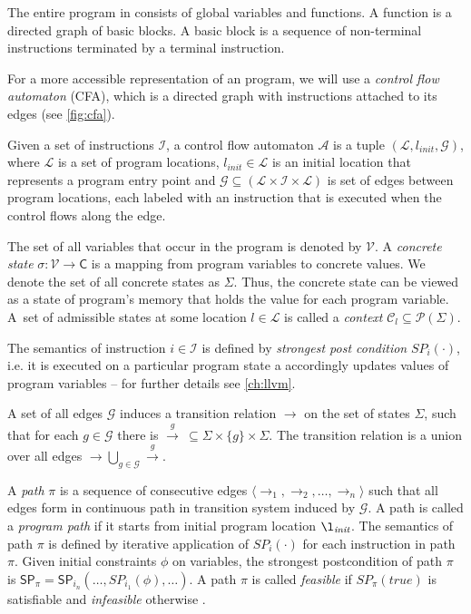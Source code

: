 The entire program in \llvm consists of global variables and functions.  A
function is a directed graph of basic blocks. A basic block is a sequence of
non-terminal instructions terminated by a terminal instruction.

For a more accessible representation of an \llvm program, we will use a
\emph{control flow automaton} (CFA), which is a directed graph with \llvm
instructions attached to its edges (see \autoref{fig:cfa}).

\begin{definition}
    Given a set of instructions $\mathcal{I}$, a control flow automaton
    $\mathcal{A}$ is a tuple $(\mathcal{L}, l_{\textit{init}}, \mathcal{G})$,
    where $\mathcal{L}$ is a set of program locations, $l_{\textit{init}} \in
    \mathcal{L}$ is an initial location that represents a program entry point
    and $\mathcal{G} \subseteq (\mathcal{L} \times \mathcal{I} \times
    \mathcal{L})$ is set of edges between program locations, each labeled with
    an instruction that is executed when the control flows along the edge.
\end{definition}

The set of all variables that occur in the \llvm program is denoted by
$\mathcal{V}$. A \emph{concrete state} $\sigma : \mathcal{V} \rightarrow
\mathsf{C}$ is a mapping from program variables to concrete values. We denote
the set of all concrete states as $\Sigma$. Thus, the concrete state can be
viewed as a state of program's memory that holds the value for each program
variable. A~set of admissible states at some location $l \in \mathcal{L}$ is
called a \emph{context} $\mathcal{C}_l \subseteq \mathcal{P}(\Sigma)$.

The semantics of instruction $i \in \mathcal{I}$ is defined by \emph{strongest
post condition} $SP_{i}(\cdot)$, i.e. it is executed on a particular program
state a accordingly updates values of program variables -- for further details
see \autoref{ch:llvm}.

A set of all edges $\mathcal{G}$ induces a transition relation $\rightarrow$ on
the set of states $\Sigma$, such that for each $g \in \mathcal{G}$ there is
$\xrightarrow{g} \: \subseteq \Sigma \times \{g\} \times \Sigma$. The
transition relation is a union over all edges $\rightarrow \bigcup_{g
\in\mathcal{G}} \xrightarrow{g}$.

A \emph{path} $\pi$ is a sequence of consecutive edges $\langle
\rightarrow_1, \rightarrow_2, \dots, \rightarrow_n \rangle$ such that all edges
form in continuous path in transition system induced by $\mathcal{G}$.  A path
is called a \emph{program path} if it starts from initial program location
$\l_{\textit{init}}$. The semantics of path $\pi$ is defined by iterative
application of $SP_{i}( \cdot )$ for each instruction in path $\pi$. Given
initial constraints $\phi$ on variables, the strongest postcondition of path
$\pi$ is $\textsf{SP}_{\pi} = \textsf{SP}_{i_n}(\dots,SP_{i_1}(\phi),\dots)$. A
path $\pi$ is called \emph{feasible} if $SP_{\pi}(\textit{true})$ is
satisfiable and \emph{infeasible} otherwise \cite{Beyer2018b}.

